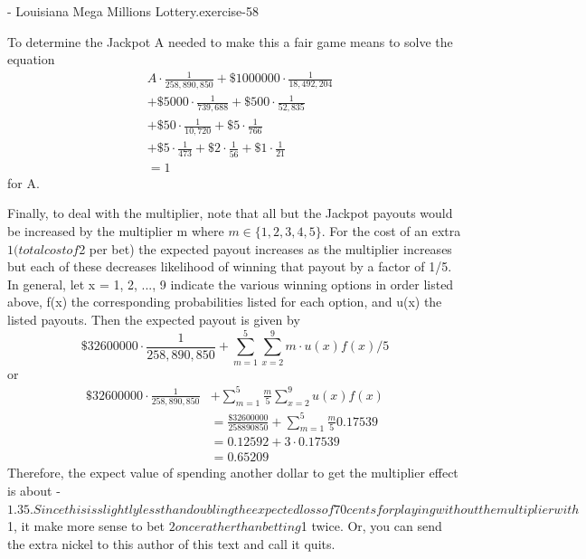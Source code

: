 \documentclass[10pt,]{book}
\numberwithin{equation}{section}
\begin{document}
\begin{inlineexercise}{- Louisiana Mega Millions Lottery.}{exercise-58}
\par
\hypertarget{p-844}{}%
To determine the Jackpot A needed to make this a fair game means to solve the equation%
\begin{align*}
& A \cdot \frac{1}{258,890,850} + \$1000000 \cdot \frac{1}{18,492,204} \\
& + \$5000 \cdot \frac{1}{739,688} + \$500 \cdot \frac{1}{52,835}\\
& + \$50 \cdot \frac{1}{10,720} + \$5 \cdot \frac{1}{766} \\
& + \$5 \cdot \frac{1}{473} + \$2 \cdot \frac{1}{56} + \$1 \cdot \frac{1}{21}\\
& = 1
\end{align*}
for A.%
\par
\hypertarget{p-845}{}%
Finally, to deal with the multiplier, note that all but the Jackpot payouts would be increased by the multiplier m where \(m \in \{1,2,3,4,5\}\).  For the cost of an extra $1 (total cost of $2 per bet) the expected payout increases as the multiplier increases but each of these decreases likelihood of winning that payout by a factor of 1/5.  In general, let x = 1, 2, ..., 9 indicate the various winning options in order listed above, f(x) the corresponding probabilities listed for each option, and  u(x) the listed payouts. Then the expected payout is given by%
\begin{equation*}
\$32600000 \cdot \frac{1}{258,890,850} + \sum_{m=1}^5
\sum_{x=2}^9 m \cdot u(x) f(x)/5 
\end{equation*}
or%
\begin{align*}
\$32600000 \cdot \frac{1}{258,890,850} & + \sum_{m=1}^5 \frac{m}{5} \sum_{x=2}^9 u(x) f(x) \\
& = \frac{\$32600000}{258890850} + \sum_{m=1}^5 \frac{m}{5} 0.17539\\
& = 0.12592 + 3 \cdot 0.17539\\
& = 0.65209
\end{align*}
Therefore, the expect value of spending another dollar to get the multiplier effect is about -$1.35.  Since this is slightly less than doubling the expected loss of 70 cents for playing without the multiplier with $1, it make more sense to bet $2 once rather than betting $1 twice.  Or, you can send the extra nickel to this author of this text and call it quits.%
\end{inlineexercise}
%
%
%
\typeout{************************************************}
\typeout{************************************************}
%
\end{document}
